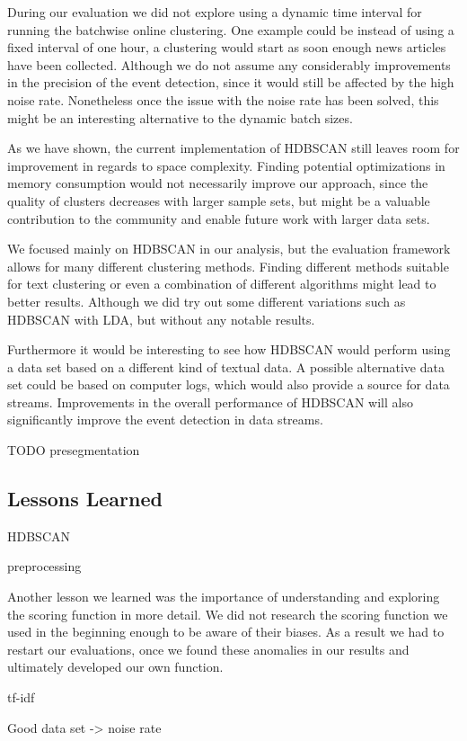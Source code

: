 During our evaluation we did not explore using a dynamic time interval for running the batchwise online clustering. 
One example could be instead of using a fixed interval of one hour, a clustering would start as soon enough news articles have been collected.
Although we do not assume any considerably improvements in the precision of the event detection, 
since it would still be affected by the high noise rate. Nonetheless once the issue with the noise rate has been solved, 
this might be an interesting alternative to the dynamic batch sizes.

As we have shown, the current implementation of HDBSCAN
still leaves room for improvement in regards to space complexity.
Finding potential optimizations in memory consumption would not necessarily improve our approach,
since the quality of clusters decreases with larger sample sets,
but might be a valuable contribution to the community and enable future work with larger data sets.

We focused mainly on HDBSCAN in our analysis, but the evaluation framework allows for many different clustering methods.
Finding different methods suitable for text clustering
or even a combination of different algorithms might lead to better results.
Although we did try out some different variations such as HDBSCAN with LDA,
but without any notable results.

Furthermore it would be interesting to see how HDBSCAN would perform
using a data set based on a different kind of textual data.
A possible alternative data set could be based on computer logs,
which would also provide a source for data streams.
Improvements in the overall performance of HDBSCAN will also significantly improve the event detection in data streams.

TODO presegmentation

\subsection{Lessons Learned}
\label{subsec:6_lessons_learned}


HDBSCAN

preprocessing

Another lesson we learned was the importance of understanding and exploring the scoring function in more detail.
We did not research the scoring function we used in the beginning enough to be aware of their biases.
As a result we had to restart our evaluations, once we found these anomalies in our results and 
ultimately developed our own function.  

tf-idf

Good data set -> noise rate
